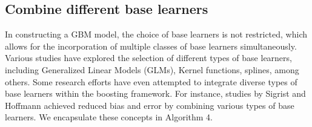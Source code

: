 \subsection{Combine different base learners}
In constructing a GBM model, the choice of base learners is not restricted, which allows for the incorporation of multiple classes of base learners simultaneously. Various studies have explored the selection of different types of base learners, including Generalized Linear Models (GLMs), Kernel functions, splines, among others. Some research efforts have even attempted to integrate diverse types of base learners within the boosting framework. For instance, studies by Sigrist \cite{sigrist2021ktboost} and Hoffmann \cite{hoffmann2004combining} achieved reduced bias and error by combining various types of base learners. We encapsulate these concepts in Algorithm 4.

